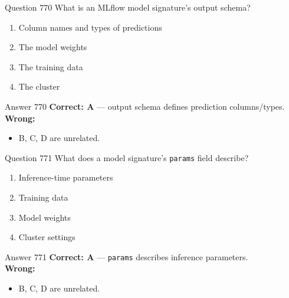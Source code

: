 \documentclass[aspectratio=169,11pt]{beamer}
\begin{document}
	\begin{frame}{Question 770}
		What is an MLflow model signature's output schema?
		\begin{enumerate}[label=\Alph*.]
			\item Column names and types of predictions
			\item The model weights
			\item The training data
			\item The cluster
		\end{enumerate}
	\end{frame}
	\begin{frame}{Answer 770}
		\textbf{Correct: A} --- output schema defines prediction columns/types.\\
		\vspace{0.5em}
		\textbf{Wrong:}
		\begin{itemize}
			\item B, C, D are unrelated.
		\end{itemize}
	\end{frame}
	
	\begin{frame}{Question 771}
		What does a model signature's \texttt{params} field describe?
		\begin{enumerate}[label=\Alph*.]
			\item Inference-time parameters
			\item Training data
			\item Model weights
			\item Cluster settings
		\end{enumerate}
	\end{frame}
	\begin{frame}{Answer 771}
		\textbf{Correct: A} --- \texttt{params} describes inference parameters.\\
		\vspace{0.5em}
		\textbf{Wrong:}
		\begin{itemize}
			\item B, C, D are unrelated.
		\end{itemize}
	\end{frame}
	
\end{document}
